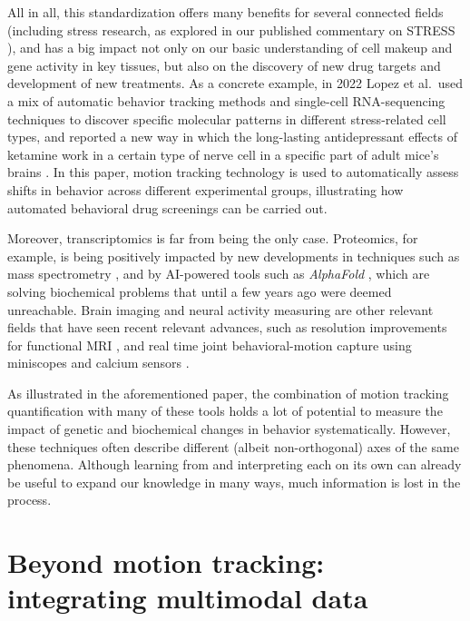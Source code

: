 All in all, this standardization offers many benefits for several connected fields (including stress research, as explored in our published commentary on STRESS \cite{Miranda2023IncreasingBehaviors}), and has a big impact not only on our basic understanding of cell makeup and gene activity in key tissues, but also on the discovery of new drug targets and development of new treatments. As a concrete example, in 2022 Lopez et al.\ used a mix of automatic behavior tracking methods and single-cell RNA-sequencing techniques to discover specific molecular patterns in different stress-related cell types, and reported a new way in which the long-lasting antidepressant effects of ketamine work in a certain type of nerve cell in a specific part of adult mice's brains \cite{Lopez2022KetamineKcnq2}. In this paper, motion tracking technology is used to automatically assess shifts in behavior across different experimental groups, illustrating how automated behavioral drug screenings can be carried out.

Moreover, transcriptomics is far from being the only case. Proteomics, for example, is being positively impacted by new developments in techniques such as mass spectrometry \cite{Mann2021ArtificialDiscovery}, and by AI-powered tools such as \textit{AlphaFold} \cite{Jumper2021HighlyAlphaFold}, which are solving biochemical problems that until a few years ago were deemed unreachable. Brain imaging and neural activity measuring are other relevant fields that have seen recent relevant advances, such as resolution improvements for functional MRI \cite{Toi2022InResolution}, and real time joint behavioral-motion capture using miniscopes and calcium sensors \cite{Dana2019High-performanceMicrocompartments, deGroot2020NinscopeInvestigations}.

As illustrated in the aforementioned paper, the combination of motion tracking quantification with many of these tools holds a lot of potential to measure the impact of genetic and biochemical changes in behavior systematically. However,  these techniques often describe different (albeit non-orthogonal) axes of the same phenomena. Although learning from and interpreting each on its own can already be useful to expand our knowledge in many ways, much information is lost in the process. 

\section{Beyond motion tracking: integrating multimodal data}


